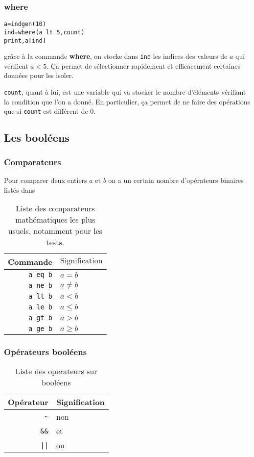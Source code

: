 \documentclass[a4paper,twoside]{article}
\begin{document}
\subsubsection{where}
\begin{verbatim}
a=indgen(10)
ind=where(a lt 5,count)
print,a[ind]
\end{verbatim}
grâce à la commande \textbf{where}, on stocke dans \texttt{ind} les indices des valeurs de $a$ qui vérifient $a < 5$. Ça permet de sélectionner rapidement et efficacement certaines données pour les isoler.

\texttt{count}, quant à lui, est une variable qui va stocker le nombre d'éléments vérifiant la condition que l'on a donné. En particulier, ça permet de ne faire des opérations que si \texttt{count} est différent de 0.

\subsection{Les booléens}
\subsubsection{Comparateurs}
Pour comparer deux entiers $a$ et $b$ on a un certain nombre d'opérateurs binaires listés dans 
\begin{table}[htb]
\centering
\begin{tabular}{|r@{ : }>{$}l<{$}|}
\hline
Commande & \text{Signification}\\\hline
\verb|a eq b| & a = b\\
\verb|a ne b| &  a \neq b\\
\verb|a lt b| & a < b\\
\verb|a le b| & a \leqslant b\\
\verb|a gt b| & a > b\\
\verb|a ge b| & a \geqslant b\\\hline
\end{tabular}
\caption{Liste des comparateurs mathématiques les plus usuels, notamment pour les tests.}\label{tab:boolean-comparator}
\end{table}

\subsubsection{Opérateurs booléens}
\begin{table}[htb]
\centering
\begin{tabular}{|r@{ : }l|}
\hline
Opérateur & Signification\\\hline
\verb|~| & non\\
\verb|&&| & et\\
\verb#||# &  ou\\\hline
\end{tabular}
\caption{Liste des operateurs sur booléens}\label{tab:boolean-operator}
\end{table}
\end{document}
